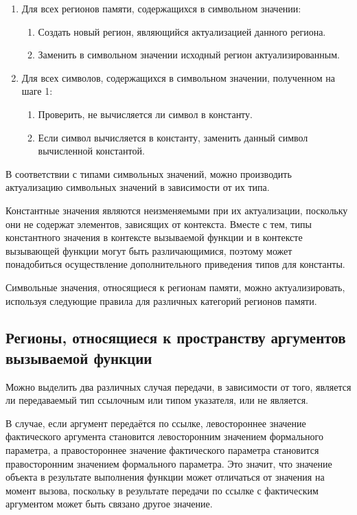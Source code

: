 \begin{enumerate}
 \item Для всех регионов памяти, содержащихся в символьном значении:
 \begin{enumerate}
  \item Создать новый регион, являющийся актуализацией данного региона.
  \item Заменить в символьном значении исходный регион актуализированным.
 \end{enumerate}
 \item Для всех символов, содержащихся в символьном значении, полученном на шаге 1:
  \begin{enumerate}
  \item Проверить, не вычисляется ли символ в константу.
  \item Если символ вычисляется в константу, заменить данный символ вычисленной константой.
 \end{enumerate}

\end{enumerate}

В соответствии с типами символьных значений, можно производить актуализацию символьных значений в зависимости от их типа.

Константные значения являются неизменяемыми при их актуализации, поскольку они не содержат элементов, зависящих от контекста. Вместе с тем, типы константного значения в контексте вызываемой функции и в контексте вызывающей функции могут быть различающимися, поэтому может понадобиться осуществление дополнительного приведения типов для константы.

Символьные значения, относящиеся к регионам памяти, можно актуализировать, используя следующие правила для различных категорий регионов памяти.

\subsection{Регионы, относящиеся к пространству аргументов вызываемой функции}
 
Можно выделить два различных случая передачи, в зависимости от того, является ли передаваемый тип ссылочным или типом указателя, или не является.
 
В случае, если аргумент передаётся по ссылке, левостороннее значение фактического аргумента становится левосторонним значением формального параметра, а правостороннее значение фактического параметра становится правосторонним значением формального параметра. Это значит, что значение объекта в результате выполнения функции может отличаться от значения на момент вызова, поскольку в результате передачи по ссылке с фактическим аргументом может быть связано другое значение.

